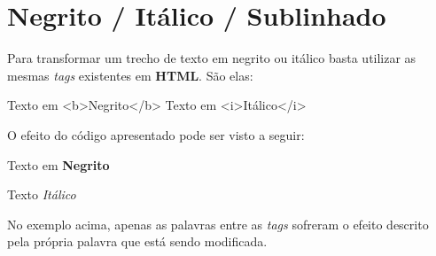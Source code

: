 \newpage \chapter{Negrito / Itálico / Sublinhado}\setcounter{SteP}{1}

Para transformar um trecho de texto em negrito ou itálico basta
utilizar as mesmas {\it tags} existentes em {\bf HTML}. São elas:

\begin{BoxVerbatim}
  Texto em <b>Negrito</b>
  Texto em <i>Itálico</i>
\end{BoxVerbatim}

O efeito do código apresentado pode ser visto a seguir:

Texto em {\bf Negrito}

Texto {\it Itálico}

No exemplo acima, apenas as palavras entre as {\it tags} sofreram o efeito
descrito pela própria palavra que está sendo modificada.

